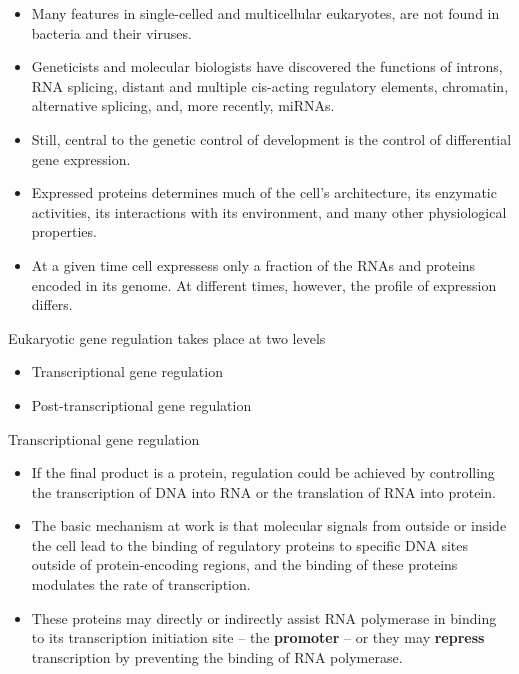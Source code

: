 \documentclass[11pt,dvipsnames,ignorenonframetext,aspectratio=169]{beamer}
\providecommand{\tightlist}{%
  \setlength{\itemsep}{0pt}\setlength{\parskip}{0pt}}
\begin{document}
\begin{frame}{}
\protect\hypertarget{section-13}{}
\begin{itemize}
\tightlist
\item
  Many features in single-celled and multicellular eukaryotes, are not
  found in bacteria and their viruses.
\item
  Geneticists and molecular biologists have discovered the functions of
  introns, RNA splicing, distant and multiple cis-acting regulatory
  elements, chromatin, alternative splicing, and, more recently, miRNAs.
\item
  Still, central to the genetic control of development is the control of
  differential gene expression.
\item
  Expressed proteins determines much of the cell's architecture, its
  enzymatic activities, its interactions with its environment, and many
  other physiological properties.
\item
  At a given time cell expressess only a fraction of the RNAs and
  proteins encoded in its genome. At different times, however, the
  profile of expression differs.
\end{itemize}
\end{frame}

\begin{frame}{Eukaryotic gene regulation takes place at two levels}
\protect\hypertarget{eukaryotic-gene-regulation-takes-place-at-two-levels}{}
\begin{itemize}
\tightlist
\item
  Transcriptional gene regulation
\item
  Post-transcriptional gene regulation
\end{itemize}
\end{frame}

\begin{frame}{Transcriptional gene regulation}
\protect\hypertarget{transcriptional-gene-regulation}{}
\begin{itemize}
\tightlist
\item
  If the final product is a protein, regulation could be achieved by
  controlling the transcription of DNA into RNA or the translation of
  RNA into protein.
\item
  The basic mechanism at work is that molecular signals from outside or
  inside the cell lead to the binding of regulatory proteins to specific
  DNA sites outside of protein-encoding regions, and the binding of
  these proteins modulates the rate of transcription.
\item
  These proteins may directly or indirectly assist RNA polymerase in
  binding to its transcription initiation site -- the \textbf{promoter}
  -- or they may \textbf{repress} transcription by preventing the
  binding of RNA polymerase.
\end{itemize}
\end{frame}
\end{document}

